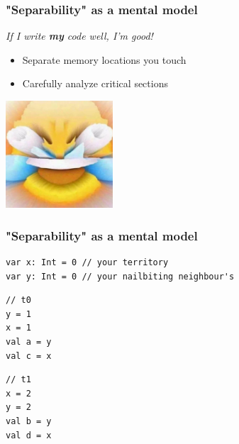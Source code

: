 \documentclass[aspectratio=1610, xcolor={dvipsnames}]{beamer}
\begin{document}
\begin{frame}
    \frametitle{"Separability" as a mental model}

    \centering
    \emph{If I write \textbf{my} code well, I'm good!}

    \begin{itemize}
        \item Separate memory locations you touch
        \item Carefully analyze critical sections
    \end{itemize}

    \pause

    \vspace{2em}
    \includegraphics[width=0.3\textwidth]{fig/smiley.jpg}

\end{frame}

\begin{frame}[fragile]
    \frametitle{"Separability" as a mental model}

    
\begin{lstlisting}
var x: Int = 0 // your territory
var y: Int = 0 // your nailbiting neighbour's
\end{lstlisting}
            \begin{multicols}{2}
                \begin{lstlisting}
// t0
y = 1
x = 1
val a = y
val c = x
                \end{lstlisting}
        
                \columnbreak
        
                \begin{lstlisting}
// t1
x = 2
y = 2
val b = y
val d = x
                \end{lstlisting}
            \end{multicols}

\phantom{a}

\end{frame}
\end{document}
